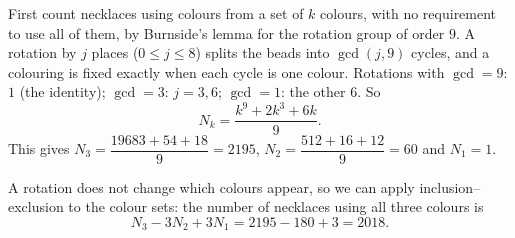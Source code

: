 First count necklaces using colours from a set of $k$ colours, with no requirement to use all of them, by Burnside's lemma for the rotation group of order $9$. A rotation by $j$ places ($0\le j\le8$) splits the beads into $\gcd(j,9)$ cycles, and a colouring is fixed exactly when each cycle is one colour. Rotations with $\gcd=9$: $1$ (the identity); $\gcd=3$: $j=3,6$; $\gcd=1$: the other $6$. So
\[
N_k=\dfrac{k^9+2k^3+6k}{9}.
\]
This gives $N_3=\dfrac{19683+54+18}{9}=2195$, $N_2=\dfrac{512+16+12}{9}=60$ and $N_1=1$.

A rotation does not change which colours appear, so we can apply inclusion--exclusion to the colour sets: the number of necklaces using all three colours is
\[
N_3-3N_2+3N_1=2195-180+3=\boxed{2018}.
\]
